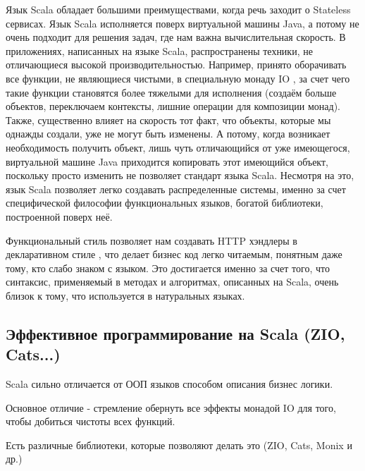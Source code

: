 \documentclass[14pt]{extarticle}
\begin{document}
    Язык Scala обладает большими преимуществами, когда речь заходит о Stateless сервисах. Язык Scala исполняется
    поверх виртуальной машины Java, а потому не очень подходит для решения задач, где нам важна вычислительная
    скорость. 
    В приложениях, написанных на языке Scala, распространены
    техники, не отличающиеся высокой производительностью. Например, принято оборачивать все функции, не являющиеся
    чистыми, в специальную монаду IO \cite{monad}, за счет чего такие функции становятся более тяжелыми для исполнения
        (создаём
    больше объектов, переключаем контексты, лишние операции для композиции монад). Также, существенно влияет на
    скорость тот факт, что объекты, которые мы однажды создали, уже не могут быть изменены. А потому, когда возникает
    необходимость получить объект, лишь чуть отличающийся от уже имеющегося, виртуальной машине Java приходится
    копировать этот имеющийся объект, поскольку просто изменить не позволяет стандарт языка Scala.
    Несмотря на это, язык Scala позволяет
    легко создавать распределенные
    системы, именно за счет
    специфической
    философии
    функциональных языков, богатой библиотеки, построенной поверх неё.

    Функциональный стиль позволяет нам создавать HTTP хэндлеры в декларативном стиле \cite{decl}, что делает бизнес код 
    легко
    читаемым, понятным даже тому, кто слабо знаком с языком. Это достигается именно за счет того, что синтаксис,
    применяемый в
    методах и
    алгоритмах, описанных на Scala, очень близок к тому, что используется в натуральных языках. \cite{declnat}

    \subsection{Эффективное программирование на Scala (ZIO, Cats...)}

    Scala сильно отличается от ООП языков способом описания бизнес логики.

    Основное отличие - стремление обернуть все эффекты монадой IO для того, чтобы добиться чистоты всех функций.

    Есть различные библиотеки, которые позволяют делать это (ZIO, Cats, Monix и др.)
\end{document}
